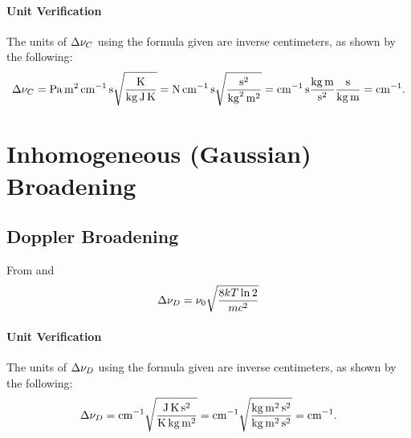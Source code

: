 \paragraph{Unit Verification}

The units of $\adif{\nu}_C$ using the formula given are inverse centimeters, as shown by the following:
\begin{equation*}
    \adif{\nu}_C = \unit{Pa.m^2.cm^{-1}.s}\sqrt{\frac{\unit{K}}{\unit{kg.J.K}}} = \unit{N.cm^{-1}.s}\sqrt{\frac{\unit{s^2}}{\unit{kg^2.m^2}}} = \unit{cm^{-1}.s}\frac{\unit{kg.m}}{\unit{s^2}}\frac{\unit{s}}{\unit{kg.m}} = \unit{cm^{-1}}.
\end{equation*}

\section{Inhomogeneous (Gaussian) Broadening}

\subsection{Doppler Broadening}

From \cite[55]{foxStudentsGuideAtomic2018} and \cite[138]{hansonSpectroscopyOpticalDiagnostics2016}
\begin{equation*}
    \adif{\nu}_D = \nu_0\sqrt{\frac{8kT\ln{2}}{mc^2}}
\end{equation*}

\paragraph{Unit Verification}

The units of $\adif{\nu}_D$ using the formula given are inverse centimeters, as shown by the following:
\begin{equation*}
    \adif{\nu}_D = \unit{cm^{-1}}\sqrt{\frac{\unit{J.K.s^2}}{\unit{K.kg.m^2}}} = \unit{cm^{-1}}\sqrt{\frac{\unit{kg.m^2.s^2}}{\unit{kg.m^2.s^2}}} = \unit{cm^{-1}}.
\end{equation*}
